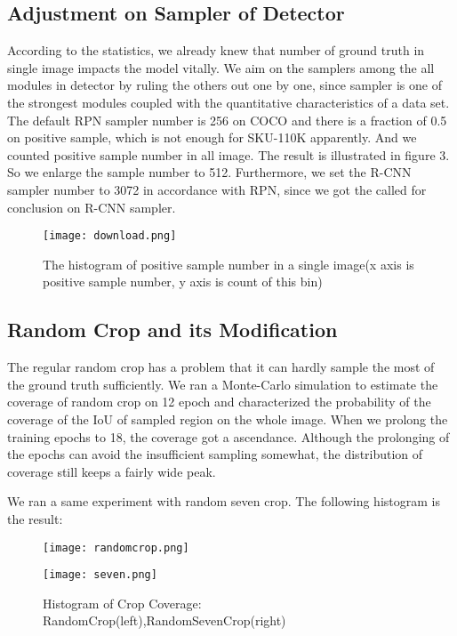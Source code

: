 \documentclass{article}
\begin{document}
\subsection{Adjustment on Sampler of Detector}
According to the statistics, we already knew that number of ground truth in single image impacts the model vitally. We aim on the samplers among the all modules in detector by ruling the others out one by one, since sampler is one of the strongest modules coupled with the quantitative characteristics of a data set. The default RPN sampler number is 256 on COCO and there is a fraction of 0.5 on positive sample, which is not enough for SKU-110K apparently. And we counted positive sample number in all image. The result is illustrated in figure 3. So we enlarge the sample number to 512. Furthermore, we set the R-CNN sampler number to 3072 in accordance with RPN, since we got the called for conclusion on R-CNN sampler.
\begin{figure}[htb]
    \centering
    \texttt{[image: download.png]}
    \caption{The histogram of positive sample number in a single image(x axis is positive sample number, y axis is count of this bin)}
    \label{fig:my_label}
\end{figure}
\subsection{Random Crop and its Modification}
The regular random crop has a problem that it can hardly sample the most of the ground truth sufficiently. We ran a Monte-Carlo simulation to estimate the coverage of random crop on 12 epoch and characterized the probability of the coverage of the IoU of sampled region on the whole image. When we prolong the training epochs to 18, the coverage got a ascendance. Although the prolonging of the epochs can avoid the insufficient sampling somewhat, the distribution of coverage still keeps a fairly wide peak. 

\par We ran a same experiment with random seven crop. The following histogram is the result:



\begin{figure}[htb]


  \begin{minipage}[b]{0.45\linewidth}
    \centering
    \texttt{[image: randomcrop.png]}
\end{minipage}\quad
  \begin{minipage}[b]{0.45\linewidth}
    \centering
    \texttt{[image: seven.png]}
\end{minipage}\quad
\caption{Histogram of Crop Coverage: RandomCrop(left),\space RandomSevenCrop(right)}
\end{figure}
\end{document}
